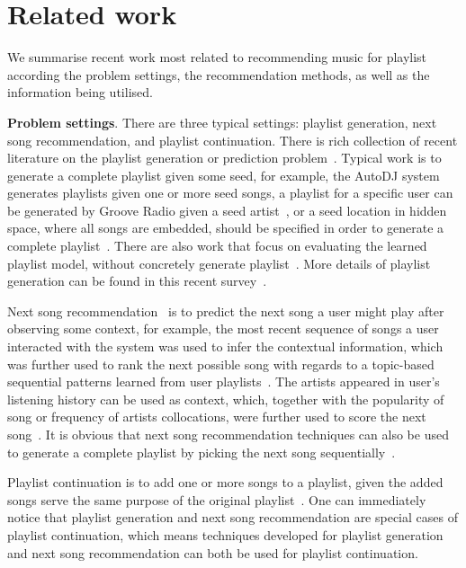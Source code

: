 \section{Related work}
\label{sec:related}

We summarise recent work most related to recommending music for playlist
according the problem settings, the recommendation methods,
as well as the information being utilised.


{\bf Problem settings}.
There are three typical settings:
playlist generation, next song recommendation, and playlist continuation.
%
There is rich collection of recent literature on the playlist generation or prediction 
problem~\cite{platt2002learning,mcfee2011natural,mcfee2012hypergraph,chen2012playlist,ben2017groove}.
%
Typical work is to generate a complete playlist given some seed,
for example, the AutoDJ system~\cite{platt2002learning} generates playlists given one or more seed songs,
a playlist for a specific user can be generated by Groove Radio given a seed artist~\cite{ben2017groove},
or a seed location in hidden space, where all songs are embedded, 
should be specified in order to generate a complete playlist~\cite{chen2012playlist}.
%
There are also work that focus on evaluating the learned playlist model, 
without concretely generate playlist~\cite{mcfee2011natural,mcfee2012hypergraph}.
More details of playlist generation can be found in this recent survey~\cite{bonnin2015automated}.


Next song recommendation~\cite{hariri2012context,bonnin2013evaluating,jannach2015beyond}
is to predict the next song a user might play after observing some context,
for example, the most recent sequence of songs a user interacted with the system was used to 
infer the contextual information, which was further used to rank the next possible song 
with regards to a topic-based sequential patterns learned from user playlists~\cite{hariri2012context}.
%
The artists appeared in user's listening history can be used as context, 
which, together with the popularity of song or frequency of artists collocations,
were further used to score the next song~\cite{mcfee2012million,bonnin2013evaluating}.
%
It is obvious that next song recommendation techniques can also be used to generate a 
complete playlist by picking the next song sequentially~\cite{bonnin2013evaluating,ben2017groove}.


Playlist continuation is to add one or more songs to a playlist, 
given the added songs serve the same purpose of the original playlist~\cite{schedl2017,recsysch2018}.
One can immediately notice that playlist generation and next song recommendation are special cases
of playlist continuation, which means techniques developed for playlist generation and 
next song recommendation can both be used for playlist continuation.


